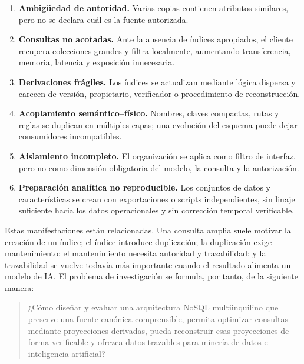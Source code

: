 \begin{enumerate}[label=\textbf{P\arabic*.},leftmargin=*]
  \item \textbf{Ambigüedad de autoridad.} Varias copias contienen atributos similares,
  pero no se declara cuál es la fuente autorizada.

  \item \textbf{Consultas no acotadas.} Ante la ausencia de índices apropiados, el
  cliente recupera colecciones grandes y filtra localmente, aumentando transferencia,
  memoria, latencia y exposición innecesaria.

  \item \textbf{Derivaciones frágiles.} Los índices se actualizan mediante lógica
  dispersa y carecen de versión, propietario, verificador o procedimiento de
  reconstrucción.

  \item \textbf{Acoplamiento semántico--físico.} Nombres, claves compactas, rutas y
  reglas se duplican en múltiples capas; una evolución del esquema puede dejar
  consumidores incompatibles.

  \item \textbf{Aislamiento incompleto.} El organización se aplica como filtro de interfaz,
  pero no como dimensión obligatoria del modelo, la consulta y la autorización.

  \item \textbf{Preparación analítica no reproducible.} Los conjuntos de datos y características
  se crean con exportaciones o scripts independientes, sin linaje suficiente hacia los
  datos operacionales y sin corrección temporal verificable.
\end{enumerate}

Estas manifestaciones están relacionadas. Una consulta amplia suele motivar la creación
de un índice; el índice introduce duplicación; la duplicación exige mantenimiento; el
mantenimiento necesita autoridad y trazabilidad; y la trazabilidad se vuelve todavía
más importante cuando el resultado alimenta un modelo de IA. El problema de
investigación se formula, por tanto, de la siguiente manera:

\begin{quote}
¿Cómo diseñar y evaluar una arquitectura NoSQL multiinquilino que preserve una fuente
canónica comprensible, permita optimizar consultas mediante proyecciones derivadas,
pueda reconstruir esas proyecciones de forma verificable y ofrezca datos trazables para
minería de datos e inteligencia artificial?
\end{quote}

